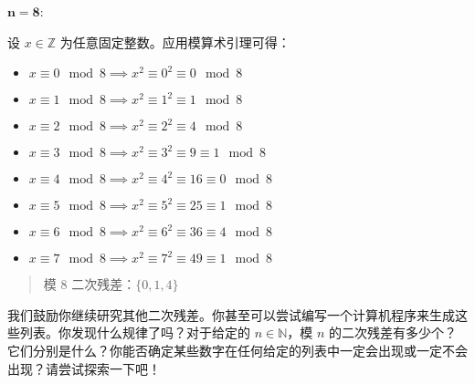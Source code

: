 \begin{example}[二次残差]
    $\mathbf{n=8}$: 

    设 $x \in \mathbb{Z}$ 为任意固定整数。应用模算术引理可得：
    \begin{itemize}
        \item $x \equiv 0 \mod 8 \implies x^2 \equiv 0^2 \equiv 0 \mod 8$
        \item $x \equiv 1 \mod 8 \implies x^2 \equiv 1^2 \equiv 1 \mod 8$
        \item $x \equiv 2 \mod 8 \implies x^2 \equiv 2^2 \equiv 4 \mod 8$
        \item $x \equiv 3 \mod 8 \implies x^2 \equiv 3^2 \equiv 9 \equiv 1 \mod 8$
        \item $x \equiv 4 \mod 8 \implies x^2 \equiv 4^2 \equiv 16 \equiv 0 \mod 8$
        \item $x \equiv 5 \mod 8 \implies x^2 \equiv 5^2 \equiv 25 \equiv 1 \mod 8$
        \item $x \equiv 6 \mod 8 \implies x^2 \equiv 6^2 \equiv 36 \equiv 4 \mod 8$
        \item $x \equiv 7 \mod 8 \implies x^2 \equiv 7^2 \equiv 49 \equiv 1 \mod 8$
    \end{itemize}
    \begin{quotation}
        \begin{center}
            \large 模 $8$ 二次残差：$\{0, 1, 4\}$
        \end{center}
    \end{quotation}

    我们鼓励你继续研究其他二次残差。你甚至可以尝试编写一个计算机程序来生成这些列表。你发现什么规律了吗？对于给定的 $n \in \mathbb{N}$，模 $n$ 的二次残差有多少个？它们分别是什么？你能否确定某些数字在任何给定的列表中一定会出现或一定不会出现？请尝试探索一下吧！
\end{example}

